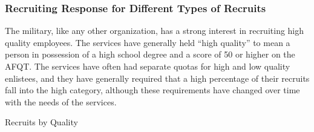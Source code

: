 \documentclass[12pt] {article}
\begin{document}
\subsubsection{Recruiting Response for Different Types of Recruits \label{sub:Different Recruit Types}}


The military, like any other organization, has a strong interest in
recruiting high quality employees. The services have generally held {}``high
quality'' to mean a person in possession of a high school degree
and a score of 50 or higher on the AFQT. The services have often had
separate quotas for high and low quality enlistees, and they have
generally required that a high percentage of their recruits fall into
the high category, although these requirements have changed over time
with the needs of the services. 

\begin{table}
\caption{Recruits by Quality}
\label{Flo: Recs by QualityLN}
\end{table}
\end{document}
